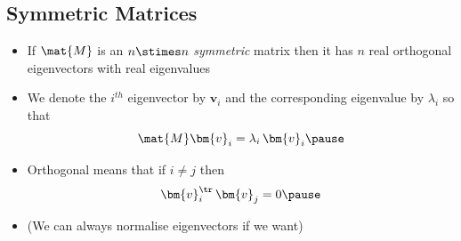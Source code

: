 
\begin{slide}
\section[-1]{Symmetric Matrices}

\begin{PauseHighLight}
  \begin{itemize}
  \item If $\mat{M}$ is an $n\stimes n$ \emph{symmetric} matrix then it has
    $n$ real orthogonal eigenvectors with real eigenvalues\pause
  \item We denote the $i^{th}$ eigenvector by $\bm{v}_i$ and the
    corresponding eigenvalue by $\lambda_i$ so that
    \begin{displaymath}
      \mat{M} \bm{v}_i = \lambda_i \, \bm{v}_i \pause
    \end{displaymath}
  \item Orthogonal means that if $i\neq j$ then
    \begin{displaymath}
      \bm{v}_i^\tr \, \bm{v}_j = 0\pause
  \end{displaymath}
  \item (We can always normalise eigenvectors if we want)\pause
  \end{itemize}
\end{PauseHighLight}

\end{slide}



